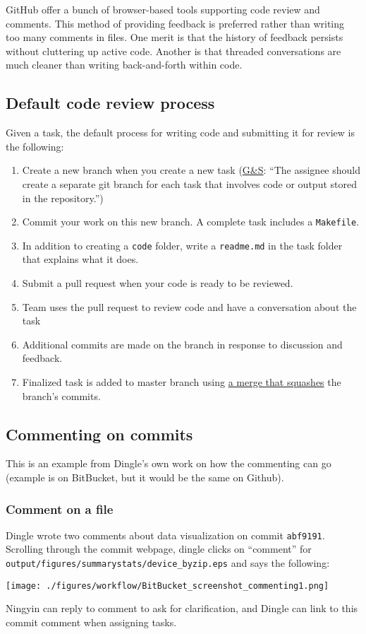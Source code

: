 GitHub offer a bunch of browser-based tools supporting code review and comments. 
This method of providing feedback is preferred rather than writing too many comments in files.
One merit is that the history of feedback persists without cluttering up active code.
Another is that threaded conversations are much cleaner than writing back-and-forth within code.

\subsection{Default code review process}\label{code_review_process}
Given a task, the default process for writing code and submitting it for review is the following:
\begin{enumerate}
\item Create a new branch when you create a new task (\href{https://github.com/gslab-econ/ra-manual/wiki/Tasks}{G\&S}: ``The assignee should create a separate git branch for each task that involves code or output stored in the repository.'')
\item Commit your work on this new branch. A complete task includes a \texttt{Makefile}.
\item In addition to creating a \texttt{code} folder, write a \texttt{readme.md} in the task folder that explains what it does.
\item Submit a pull request when your code is ready to be reviewed.
\item Team uses the pull request to review code and have a conversation about the task
\item Additional commits are made on the branch in response to discussion and feedback.
\item Finalized task is added to master branch using \href{https://bitbucket.org/blog/git-squash-commits-merging-bitbucket}{a merge that squashes} the branch's commits.
\end{enumerate}


\subsection{Commenting on commits}

This is an example from Dingle's own work on how the commenting can go (example is on BitBucket, but it would be the same on Github).
\subsubsection{Comment on a file}
Dingle wrote two comments about data visualization on commit \texttt{abf9191}.
Scrolling through the commit webpage, dingle clicks on ``comment'' for \texttt{output/figures/summarystats/device\_byzip.eps} and says the following:
\begin{center}\texttt{[image: ./figures/workflow/BitBucket\_screenshot\_commenting1.png]}\end{center}
Ningyin can reply to comment to ask for clarification, and Dingle can link to this commit comment when assigning tasks.

